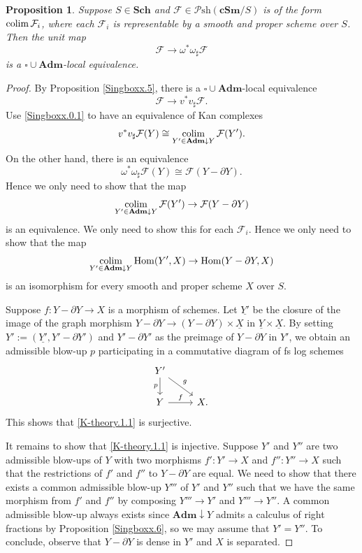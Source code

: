 \documentclass[11pt, a4paper]{amsart}
\newtheorem{prop}[thm]{Proposition}
\theoremstyle{definition}
\numberwithin{equation}{subsection}
\newcommand{\Sch}{\mathbf{Sch}}
\newcommand{\cSm}{\mathbf{cSm}}
\renewcommand{\hom}{\operatorname{Hom}}				 %
\newcommand{\colimit}{\mathop{\rm colim}}
\newcommand{\Adm}{\mathbf{Adm}}
\renewcommand{\ul}{\underline}
\newcommand{\cF}{\mathcal{F}}
\newcommand{\boxx}{\square}
\newcommand{\infPsh}{\mathcal{P}\mathrm{sh}}
\begin{document}
\begin{prop}
\label{K-theory.1}
Suppose $S\in \Sch$ and $\cF\in \infPsh(\cSm/S)$ is of the form $\colimit \cF_i$,  
where each $\cF_i$ is representable by a smooth and proper scheme over $S$.
Then the unit map
\[
\cF\rightarrow  \omega^* \omega_\sharp \cF
\]
is a $\boxx\cup\Adm$-local  equivalence.
\end{prop}
\begin{proof}
By Proposition \ref{Singboxx.5}, there is a $\boxx\cup \Adm$-local  equivalence
\[
\cF\to v^*v_\sharp \cF.
\]
Use \eqref{Singboxx.0.1} to have an equivalence of Kan complexes
\[
v^*v_\sharp \cF(Y)\cong \colimit_{Y'\in \Adm\downarrow Y} \cF(Y').
\]
On the other hand, there is an equivalence
\[
\omega^*\omega_\sharp \cF(Y)
\cong
\cF(Y-\partial Y).
\]
Hence we only need to show that the map
\[
\colimit_{Y'\in \Adm \downarrow Y}\cF(Y')
\to
\cF(Y-\partial Y)
\]
is an equivalence.
We only need to show this for each $\cF_i$.
Hence we only need to show that the map
\begin{equation}
\label{K-theory.1.1}
\colimit_{Y'\in \Adm\downarrow Y} \hom(Y',X)
\to
\hom(Y-\partial Y,X)
\end{equation}
is an isomorphism for every smooth and proper scheme $X$ over $S$.

Suppose $f\colon Y-\partial Y\to X$ is a morphism of schemes.
Let $\ul{Y'}$ be the closure of the image of the graph morphism 
$Y-\partial Y\to (Y-\partial Y)\times \ul{X}$ in $\ul{Y}\times \ul{X}$.
By setting $Y':=(\ul{Y'},Y'-\partial Y')$ and $Y'-\partial Y'$ as the preimage of $Y-\partial Y$ in $Y'$,
we obtain an admissible blow-up $p$ participating 
in a commutative diagram of fs log schemes
\[
\begin{tikzcd}
Y'\arrow[d,"p"']\arrow[rd,"g"]
\\
Y\arrow[r,"f"] & X.
\end{tikzcd}
\]
This shows that \eqref{K-theory.1.1} is surjective.

It remains to show that \eqref{K-theory.1.1} is injective.
Suppose $Y'$ and $Y''$ are two admissible blow-ups of $Y$ with two morphisms $f'\colon Y'\to X$ and 
$f''\colon Y''\to X$ such that the restrictions of $f'$ and $f''$ to $Y-\partial Y$ are equal.
We need to show that there exists a common admissible blow-up $Y'''$ of $Y'$ and $Y''$ such that 
we have the same morphism from $f'$ and $f''$ by composing $Y'''\to Y'$ and $Y'''\to Y''$.
A common admissible blow-up always exists since $\Adm\downarrow Y$ admits a calculus of 
right fractions by Proposition \ref{Singboxx.6}, so we may assume that $Y'=Y''$.
To conclude, 
observe that $Y-\partial Y$ is dense in $Y'$ and $X$ is separated.
\end{proof}
\end{document}
